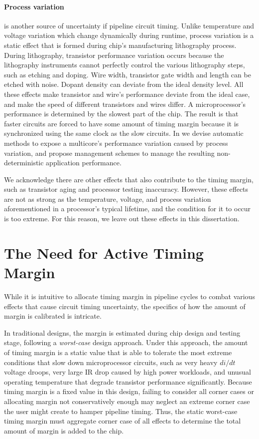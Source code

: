 \paragraph{Process variation} is another source of uncertainty if pipeline circuit timing. Unlike temperature and voltage variation which change dynamically during runtime, process variation is a static effect that is formed during chip's manufacturing lithography process. During lithography, transistor performance variation occurs because the lithography instruments cannot perfectly control the various lithography steps, such as etching and doping. Wire width, transistor gate width and length can be etched with noise. Dopant density can deviate from the ideal density level. All these effects make transistor and wire's performance deviate from the ideal case, and make the speed of different transistors and wires differ. A microprocessor's performance is determined by the slowest part of the chip. The result is that faster circuits are forced to have some amount of timing margin because it is synchronized using the same clock as the slow circuits. In  we devise automatic methods to expose a multicore's performance variation caused by process variation, and propose management schemes to manage the resulting non-deterministic application performance.

We acknowledge there are other effects that also contribute to the timing margin, such as transistor aging and processor testing inaccuracy. However, these effects are not as strong as the temperature, voltage, and process variation aforementioned in a processor's typical lifetime, and the condition for it to occur is too extreme. For this reason, we leave out these effects in this dissertation.

\section{The Need for Active Timing Margin}
\label{sec:background:motivation}

While it is intuitive to allocate timing margin in pipeline cycles to combat various effects that cause circuit timing uncertainty, the specifics of how the amount of margin is calibrated is intricate. 

In traditional designs, the margin is estimated during chip design and testing stage, following a \textit{worst-case} design approach. Under this approach, the amount of timing margin is a static value that is able to tolerate the most extreme conditions that slow down microprocessor circuits, such as very heavy $di/dt$ voltage droops, very large IR drop caused by high power workloads, and unusual operating temperature that degrade transistor performance significantly. Because timing margin is a fixed value in this design, failing to consider all corner cases or allocating margin not conservatively enough may neglect an extreme corner case the user might create to hamper pipeline timing. Thus, the static worst-case timing margin must aggregate corner case of all effects to determine the total amount of margin is added to the chip.

